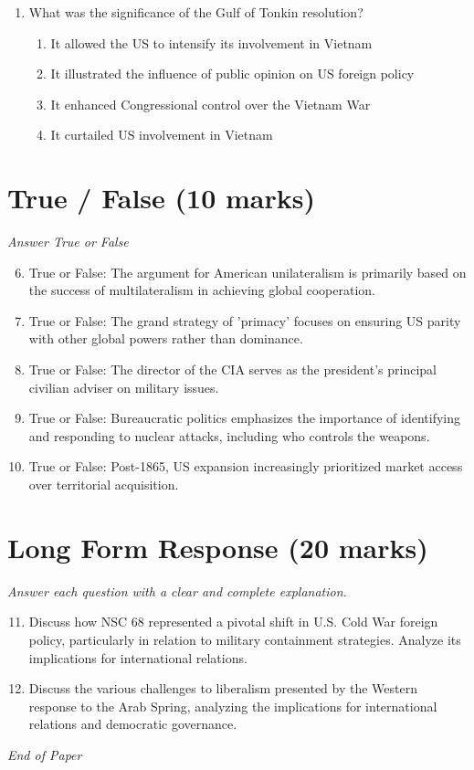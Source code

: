 \documentclass[12pt]{article}
\begin{document}
\begin{enumerate}[label=\arabic*.]
\begin{enumerate}[label=(\alph*)]
    \item A new global economic framework
    \item A new era of globalization
\end{enumerate}
\item What was the significance of the Gulf of Tonkin resolution?
\begin{enumerate}[label=(\alph*)]
    \item It allowed the US to intensify its involvement in Vietnam
    \item It illustrated the influence of public opinion on US foreign policy
    \item It enhanced Congressional control over the Vietnam War
    \item It curtailed US involvement in Vietnam
\end{enumerate}
\end{enumerate}

\section*{True / False (10 marks)}
\textit{Answer True or False}
\begin{enumerate}[label=\arabic*.]
\setcounter{enumi}{5}
\item True or False: The argument for American unilateralism is primarily based on the success of multilateralism in achieving global cooperation.
\item True or False: The grand strategy of 'primacy' focuses on ensuring US parity with other global powers rather than dominance.
\item True or False: The director of the CIA serves as the president's principal civilian adviser on military issues.
\item True or False: Bureaucratic politics emphasizes the importance of identifying and responding to nuclear attacks, including who controls the weapons.
\item True or False: Post-1865, US expansion increasingly prioritized market access over territorial acquisition.
\end{enumerate}

\section*{Long Form Response (20 marks)}
\textit{Answer each question with a clear and complete explanation.}
\begin{enumerate}[label=\arabic*.]
\setcounter{enumi}{10}
\item Discuss how NSC 68 represented a pivotal shift in U.S. Cold War foreign policy, particularly in relation to military containment strategies. Analyze its implications for international relations.
\item Discuss the various challenges to liberalism presented by the Western response to the Arab Spring, analyzing the implications for international relations and democratic governance.
\end{enumerate}

\vfill
\noindent\textit{End of Paper}
\end{document}
